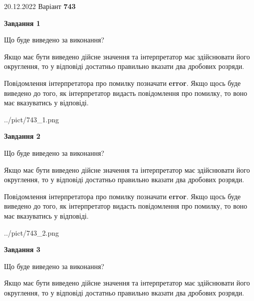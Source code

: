 \documentclass[12pt, ukrainian]{article}
\begin{document}
{20.12.2022 Варіант \No \textbf { 743 }\par}
{
\begin {Large}

{\begin {center}\textbf{Завдання 1}\end {center}}\par
Що буде виведено за виконання? \par

Якщо має бути виведено дійсне значення та інтерпретатор має здійснювати його округлення, 
то у відповіді достатньо правильно вказати два дробових розряди.

Повідомлення інтерпретатора про помилку позначати \textbf{error}.
Якщо щось буде виведено до того, як інтерпретатор видасть повідомлення про помилку, 
то воно має вказуватись у відповіді. \par

\begin{center}
	{../pict/743_1.png}
\end{center}
\newpage

{\begin {center}\textbf{Завдання 2}\end {center}}\par
Що буде виведено за виконання? \par

Якщо має бути виведено дійсне значення та інтерпретатор має здійснювати його округлення, 
то у відповіді достатньо правильно вказати два дробових розряди.

Повідомлення інтерпретатора про помилку позначати \textbf{error}.
Якщо щось буде виведено до того, як інтерпретатор видасть повідомлення про помилку, 
то воно має вказуватись у відповіді. \par

\begin{center}
	{../pict/743_2.png}
\end{center}
\newpage

{\begin {center}\textbf{Завдання 3}\end {center}}\par
Що буде виведено за виконання? \par

Якщо має бути виведено дійсне значення та інтерпретатор має здійснювати його округлення, 
то у відповіді достатньо правильно вказати два дробових розряди.


\end{Large}}
\end{document}
